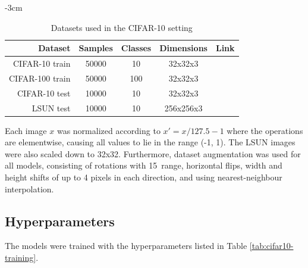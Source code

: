 \begin{table}[]
    \centering
    \caption{Datasets used in the CIFAR-10 setting}
    \addtolength{\leftskip} {-3cm}
    \addtolength{\rightskip}{-3cm}
    \begin{tabular}{r||c|c|c|c} 
    \hline
    Dataset & Samples & Classes & Dimensions & Link \\ [0.5ex] 
    \hline
    \hline
    CIFAR-10 train & 50000 & 10 & 32x32x3 & \href{https://www.cs.toronto.edu/~kriz/cifar.html} \\
    CIFAR-100 train & 50000 & 100 & 32x32x3 & \href{https://www.cs.toronto.edu/~kriz/cifar.html} \\
    CIFAR-10 test & 10000 & 10 & 32x32x3 & \href{https://www.cs.toronto.edu/~kriz/cifar.html} \\
    LSUN test & 10000 & 10 & 256x256x3 & \href{https://www.yf.io/p/lsun} \\
    \hline
    \end{tabular}

    \label{tab:datasets}
\end{table}

Each image $x$ was normalized according to $x' = x/127.5 - 1$ where the operations are elementwise, causing all values to lie in the range (-1, 1). The LSUN images were also scaled down to 32x32. Furthermore, dataset augmentation was used for all models, consisting of rotations with 15\degree \ range, horizontal flips, width and height shifts of up to 4 pixels in each direction, and using nearest-neighbour interpolation.

\subsection{Hyperparameters}
The models were trained with the hyperparameters listed in Table \ref{tab:cifar10-training}. 

